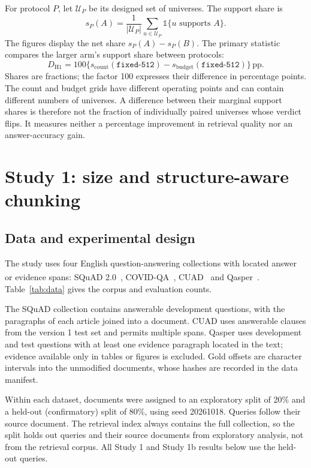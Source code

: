 \documentclass[11pt]{article}
\newcommand{\pp}{\ensuremath{\,\mathrm{pp}}}
\newcommand{\chunk}[1]{\texttt{#1}}
\newcommand{\ind}{\mathbb{1}}
\newcommand{\citeL}[1]{\cite{#1}\textsuperscript{\textcolor{red}{\dag}}}
\begin{document}
For protocol $P$, let $\mathcal U_P$ be its designed set of universes. The support share is
\begin{equation}
 s_P(A)=\frac{1}{|\mathcal U_P|}\sum_{u\in\mathcal U_P}
 \ind\{u\text{ supports }A\}.
 \label{eq:share}
\end{equation}
The figures display the net share $s_P(A)-s_P(B)$. The primary statistic compares the larger arm's support share
between protocols:
\begin{equation}
 D_{\mathrm{H1}}=100\{s_{\mathrm{count}}(\chunk{fixed-512})
                  -s_{\mathrm{budget}}(\chunk{fixed-512})\}\pp.
 \label{eq:h1}
\end{equation}
Shares are fractions; the factor 100 expresses their difference in percentage points. The count and budget grids have
different operating points and can contain different numbers of universes. A difference between their marginal
support shares is therefore not the fraction of individually paired universes whose verdict flips. It measures
neither a percentage improvement in retrieval quality nor an answer-accuracy gain.

\section{Study 1: size and structure-aware chunking}\label{sec:study1}
\subsection{Data and experimental design}
The study uses four English question-answering collections with located answer or evidence spans: SQuAD
2.0~\citeL{rajpurkar2018squad2}, COVID-QA~\citeL{moller2020covidqa}, CUAD~\citeL{hendrycks2021cuad} and
Qasper~\citeL{dasigi2021qasper}. Table~\ref{tab:data} gives the corpus and evaluation counts.

The SQuAD collection contains answerable development questions, with the paragraphs of each article joined into a
document. CUAD uses answerable clauses from the version 1 test set and permits multiple spans. Qasper uses development
and test questions with at least one evidence paragraph located in the text; evidence available only in tables or
figures is excluded. Gold offsets are character intervals into the unmodified documents, whose hashes are recorded in
the data manifest.

Within each dataset, documents were assigned to an exploratory split of 20\% and a held-out (confirmatory) split of
80\%, using seed 20261018. Queries follow their source document. The retrieval index always contains the full
collection, so the split holds out queries and their source documents from exploratory analysis, not from the
retrieval corpus. All Study 1 and Study 1b results below use the \EoneNq{} held-out queries.
\end{document}
